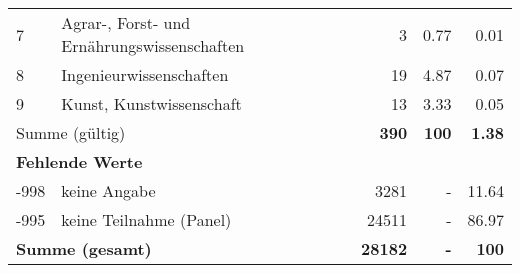 \begin{longtable}{lXrrr}
     7 &
     \multicolumn{1}{X}{ Agrar-, Forst- und Ernährungswissenschaften   } &


       \num{3} &
       \num[round-mode=places,round-precision=2]{0.77} &
         \num[round-mode=places,round-precision=2]{0.01} \\

     8 &
     \multicolumn{1}{X}{ Ingenieurwissenschaften   } &


       \num{19} &
       \num[round-mode=places,round-precision=2]{4.87} &
         \num[round-mode=places,round-precision=2]{0.07} \\

     9 &
     \multicolumn{1}{X}{ Kunst, Kunstwissenschaft   } &


       \num{13} &
       \num[round-mode=places,round-precision=2]{3.33} &
         \num[round-mode=places,round-precision=2]{0.05} \\
     \midrule
     \multicolumn{2}{l}{Summe (gültig)} &
       \textbf{\num{390}} &
     \textbf{\num{100}} &
       \textbf{\num[round-mode=places,round-precision=2]{1.38}} \\
     \multicolumn{5}{l}{\textbf{Fehlende Werte}}\\
       -998 &
       keine Angabe &
         \num{3281} &
        - &
         \num[round-mode=places,round-precision=2]{11.64} \\
       -995 &
       keine Teilnahme (Panel) &
         \num{24511} &
        - &
         \num[round-mode=places,round-precision=2]{86.97} \\
     \midrule
     \multicolumn{2}{l}{\textbf{Summe (gesamt)}} &
          \textbf{\num{28182}} &
        \textbf{-} &
        \textbf{\num{100}} \\
     \bottomrule
     \end{longtable}
     
